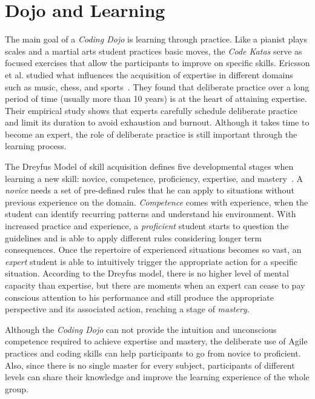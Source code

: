 \section{Dojo and Learning}\label{sec:learning}

The main goal of a \emph{Coding Dojo} is learning through practice. Like a pianist
plays scales and a martial arts student practices basic moves, the \emph{Code Katas}
serve as focused exercises that allow the participants to improve on specific skills.
Ericsson et al. studied what influences the acquisition of expertise in
different domains such as music, chess, and sports~\cite{DeliberatePractice}. They found
that deliberate practice over a long period of time (usually more than 10 years) is at the
heart of attaining expertise. Their empirical study shows that experts carefully schedule
deliberate practice and limit its duration to avoid exhaustion and burnout. Although it
takes time to become an expert, the role of deliberate practice is still important through
the learning process.

The Dreyfus Model of skill acquisition defines five developmental stages when learning
a new skill: novice, competence, proficiency, expertise, and mastery~\cite{Dreyfus}. A
\emph{novice} needs a set of pre-defined rules that he can apply to situations without
previous experience on the domain. \emph{Competence} comes with experience, when the student
can identify recurring patterns and understand his environment. With increased practice and
experience, a \emph{proficient} student starts to question the guidelines and is able to
apply different rules considering longer term consequences. Once the repertoire of
experienced situations becomes so vast, an \emph{expert} student is able to intuitively
trigger the appropriate action for a specific situation. According to the Dreyfus model,
there is no higher level of mental capacity than expertise, but there are moments when an
expert can cease to pay conscious attention to his performance and still produce the
appropriate perspective and its associated action, reaching a stage of \emph{mastery}.

Although the \emph{Coding Dojo} can not provide the intuition and unconscious competence
required to achieve expertise and mastery, the deliberate use of Agile practices
and coding skills can help participants to go from novice to proficient. Also, since
there is no single master for every subject, participants of different levels can
share their knowledge and improve the learning experience of the whole group.

